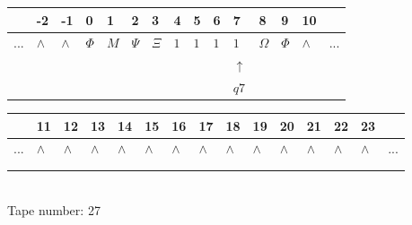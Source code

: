 \documentclass[11pt]{article}
\begin{document}
\begin{table}[H]
\centering
\begin{tabular}{lllllllllllllll}
 & -2 & -1 & 0 & 1 & 2 & 3 & 4 & 5 & 6 & 7 & 8 & 9 & 10 & \\
\hline
$...$ & \multicolumn{1}{|l|}{$\wedge$} & \multicolumn{1}{|l|}{$\wedge$} & \multicolumn{1}{|l|}{$\Phi$} & \multicolumn{1}{|l|}{$M$} & \multicolumn{1}{|l|}{$\Psi$} & \multicolumn{1}{|l|}{$\Xi$} & \multicolumn{1}{|l|}{$1$} & \multicolumn{1}{|l|}{$1$} & \multicolumn{1}{|l|}{$1$} & \multicolumn{1}{|l|}{$1$} & \multicolumn{1}{|l|}{$\Omega$} & \multicolumn{1}{|l|}{$\Phi$} & \multicolumn{1}{|l|}{$\wedge$} & $...$\\
\hline
&  &  &  &  &  &  &  &  &  & $\uparrow$ &  &  &  &  \\
&  &  &  &  &  &  &  &  &  & $ q7 $ &  &  &  &  \\
\end{tabular}
\begin{tabular}{lllllllllllllll}
 & 11 & 12 & 13 & 14 & 15 & 16 & 17 & 18 & 19 & 20 & 21 & 22 & 23 & \\
\hline
$...$ & \multicolumn{1}{|l|}{$\wedge$} & \multicolumn{1}{|l|}{$\wedge$} & \multicolumn{1}{|l|}{$\wedge$} & \multicolumn{1}{|l|}{$\wedge$} & \multicolumn{1}{|l|}{$\wedge$} & \multicolumn{1}{|l|}{$\wedge$} & \multicolumn{1}{|l|}{$\wedge$} & \multicolumn{1}{|l|}{$\wedge$} & \multicolumn{1}{|l|}{$\wedge$} & \multicolumn{1}{|l|}{$\wedge$} & \multicolumn{1}{|l|}{$\wedge$} & \multicolumn{1}{|l|}{$\wedge$} & \multicolumn{1}{|l|}{$\wedge$} & $...$\\
\hline
&  &  &  &  &  &  &  &  &  &  &  &  &  &  \\
&  &  &  &  &  &  &  &  &  &  &  &  &  &  \\
\end{tabular}
\\
Tape number: 27
\noindent\makebox[\linewidth]{\hdashrule{\textwidth}{1pt}{1pt}}\end{table}
\clearpage
\end{document}

